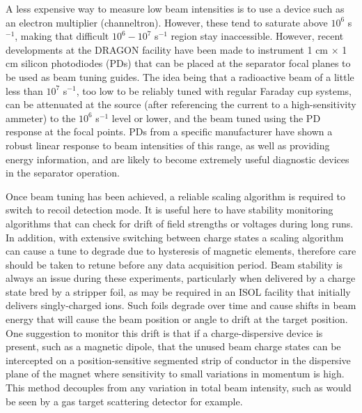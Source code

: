 A less expensive way to measure low beam intensities is to use a device such as an electron multiplier (channeltron). However, these tend to saturate above $10^{6}$ s$^{-1}$, making that difficult $10^{6}-10^{7}$ s$^{-1}$ region stay inaccessible. However, recent developments at the DRAGON facility \cite{chr14} have been made to instrument 1 cm $\times$ 1 cm silicon photodiodes (PDs) that can be placed at the separator focal planes to be used as beam tuning guides. The idea being that a radioactive beam of a little less than $10^{7}$ s$^{-1}$, too low to be reliably tuned with regular Faraday cup systems, can be attenuated at the source (after referencing the current to a high-sensitivity ammeter) to the $10^{6}$ s$^{-1}$ level or lower, and the beam tuned using the PD response at the focal points. PDs from a specific manufacturer have shown a robust linear response to beam intensities of this range, as well as providing energy information, and are likely to become extremely useful diagnostic devices in the separator operation.  

Once beam tuning has been achieved, a reliable scaling algorithm is required to switch to recoil detection mode. It is useful here to have stability monitoring algorithms that can check for drift of field strengths or voltages during long runs. In addition, with extensive switching between charge states a scaling algorithm can cause a tune to degrade due to hysteresis of magnetic elements, therefore care should be taken to retune before any data acquisition period. Beam stability is always an issue during these experiments, particularly when delivered by a charge state bred by a stripper foil, as may be required in an ISOL facility that initially delivers singly-charged ions. Such foils degrade over time and cause shifts in beam energy that will cause the beam position or angle to drift at the target position. One suggestion to monitor this drift is that if a charge-dispersive device is present, such as a magnetic dipole, that the unused beam charge states can be intercepted on a position-sensitive segmented strip of conductor in the dispersive plane of the magnet where sensitivity to small variations in momentum is high. This method decouples from any variation in total beam intensity, such as would be seen by a gas target scattering detector for example.

